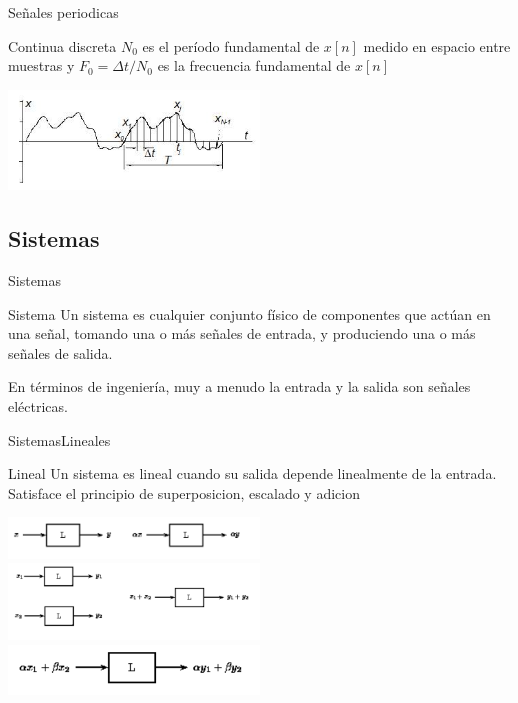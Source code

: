 \begin{darkframes}
\begin{frame}{Señales periodicas}
\begin{block}{Continua discreta}
            $N_0$ es el período fundamental de $x[n]$ medido en espacio entre muestras
            y  $F_0=\Delta t/N_0$ es la frecuencia fundamental de $x[n]$
      \end{block}
         \center\includegraphics[width=0.5\textwidth]{1_clase/periodica}
      \vfill
      \end{frame}
      \subsection{Sistemas}
      \begin{frame}{Sistemas}
         \begin{block}{Sistema}
            Un sistema es cualquier conjunto físico de componentes que actúan en una señal, tomando una o más señales de entrada, y produciendo una o más señales de salida.
         \end{block}
            En términos de ingeniería, muy a menudo la entrada y la salida son señales eléctricas.
         \vfill
      \end{frame}
      \begin{frame}{Sistemas}{Lineales}
         \begin{block}{Lineal}
            Un sistema es lineal cuando su salida depende linealmente de la entrada.
            Satisface el principio de superposicion, escalado y adicion
         \end{block}
         \center\includegraphics[width=0.5\textwidth]{1_clase/superposicion1}
         \center\includegraphics[width=0.5\textwidth]{1_clase/superposicion2}
         \center\includegraphics[width=0.5\textwidth]{1_clase/superposicion3}

\end{frame}
\end{darkframes}
